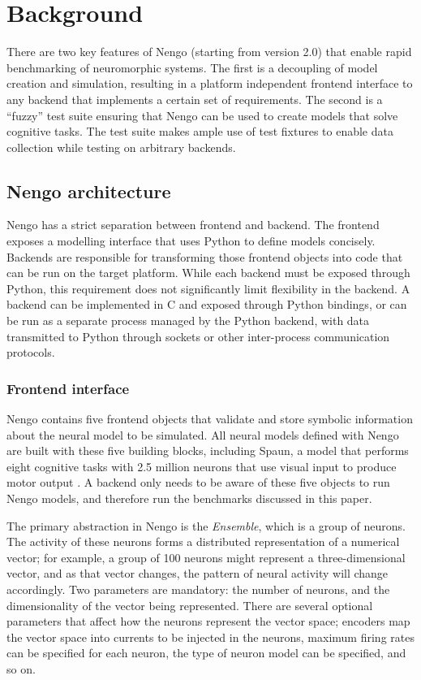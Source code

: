 \documentclass{frontiersSCNS}
\begin{document}
\section{Background}

There are two key features of Nengo
(starting from version 2.0)
that enable rapid benchmarking of neuromorphic systems.
The first is a decoupling of model creation and simulation,
resulting in a platform independent frontend interface
to any backend that implements a certain set of requirements.
The second is a ``fuzzy'' test suite ensuring that
Nengo can be used to create models that solve cognitive tasks.
The test suite makes ample use of test fixtures
to enable data collection while testing on arbitrary backends.

\subsection{Nengo architecture}

Nengo has a strict separation between
frontend and backend.
The frontend exposes a modelling interface
that uses Python to define models concisely.
Backends are responsible for transforming
those frontend objects into code that
can be run on the target platform.
While each backend must be exposed
through Python, this requirement
does not significantly limit
flexibility in the backend.
A backend can be implemented in C and exposed
through Python bindings,
or can be run as a separate process
managed by the Python backend,
with data transmitted to Python through sockets
or other inter-process communication protocols.

\subsubsection{Frontend interface}

Nengo contains five frontend objects
that validate and store symbolic information
about the neural model to be simulated.
All neural models defined with Nengo
are built with these five building blocks,
including Spaun, a model that performs
eight cognitive tasks with 2.5 million neurons
that use visual input to produce motor output
\cite{eliasmith2012}.
A backend only needs to be aware of these
five objects to run Nengo models,
and therefore run the benchmarks discussed in this paper.

The primary abstraction in Nengo is the \textit{Ensemble},
which is a group of neurons.
The activity of these neurons
forms a distributed representation of a numerical vector;
for example, a group of 100 neurons might represent
a three-dimensional vector,
and as that vector changes,
the pattern of neural activity
will change accordingly.
Two parameters are mandatory: the number of neurons,
and the dimensionality of the vector being represented.
There are several optional parameters that
affect how the neurons represent the vector space;
encoders map the vector space into currents
to be injected in the neurons,
maximum firing rates can be specified for each neuron,
the type of neuron model can be specified,
and so on.
\end{document}
